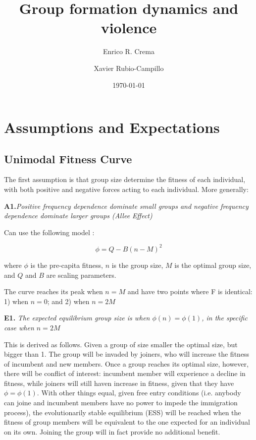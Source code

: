 \documentclass{article}
\begin{document}
\title{Group formation dynamics and violence} %
\author{Enrico R. Crema \and Xavier Rubio-Campillo}

\date{\today}

\maketitle

\section{Assumptions and Expectations}

\subsection{Unimodal Fitness Curve}

The first assumption is that group size determine the fitness of each individual, with both positive and negative forces acting to each individual. More generally:

\vspace{10 mm}
{\bf A1.}\emph{Positive frequency dependence dominate small groups and negative frequency dependence dominate larger groups (Allee Effect)}
\vspace{10 mm}



Can use the following model \citep{greene2001}:

\begin{equation}
\label{groupfitness}
\phi=Q-B(n-M)^2
\end{equation}

where $\phi$ is the pre-capita fitness, $n$ is the group size, $M$ is the optimal group size, and $Q$ and $B$ are scaling parameters.

The curve reaches its peak when $n=M$ and have two points where F is identical: 1) when $n=0$; and 2) when $n=2M$

\vspace{10 mm}
{\bf E1.} \emph{The expected equilibrium group size is when $\phi(n)=\phi(1)$, in the specific case when $n=2M$}
\vspace{10 mm}


This is derived as follows. Given a group of size smaller the optimal size, but bigger than 1. The group will be invaded by joiners, who will increase the fitness of incumbent and new members. Once a group reaches its optimal size, however, there will be conflict of interest: incumbent member will experience a decline in fitness, while joiners will still haven increase in fitness, given that they have $\phi=\phi(1)$. With other things equal, given free entry conditions (i.e. anybody can joine and incumbent members have no power to impede the immigration process), the evolutionarily stable equilibrium (ESS) will be reached when the fitness of group members will be equivalent to the one expected for an individual on its own. Joining the group will in fact provide no additional benefit.
\end{document}

